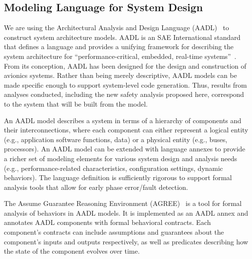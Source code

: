 \subsection{Modeling Language for System Design}
\label{subsec:aadl-agree}
We are using the Architectural Analysis and Design Language (AADL)~\cite{FeilerModelBasedEngineering2012} to construct system architecture models.  AADL is an SAE International standard that defines a language and provides a unifying framework for describing the system architecture for ``performance-critical, embedded, real-time systems''~\cite{AADL_Standard}. From its conception, AADL has been designed for the design and construction of avionics systems.  %
Rather than being merely descriptive, AADL models can be made specific enough to support system-level code generation.  Thus, results from analyses conducted, including the new safety analysis proposed here, correspond to the system that will be built from the model.  

An AADL model describes a system in terms of a hierarchy of components and their interconnections, where each component can either represent a logical entity (e.g., application software functions, data) or a physical entity (e.g., buses, processors). An AADL model can be extended with language annexes to provide a richer set of modeling elements for various system design and analysis needs (e.g., performance-related characteristics, configuration settings, dynamic behaviors). The language definition is sufficiently rigorous to support formal analysis tools that allow for early phase error/fault detection.

The Assume Guarantee Reasoning Environment (AGREE)~\cite{NFM2012:CoGaMiWhLaLu} is a tool for formal analysis of behaviors in AADL models.  It is implemented as an AADL annex and annotates AADL components with formal behavioral contracts. Each component's contracts can include assumptions and guarantees about the component's inputs and outputs respectively, as well as predicates describing how the state of the component evolves over time.

